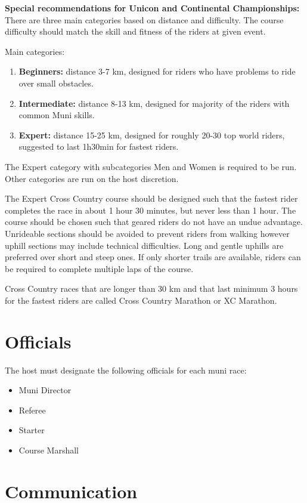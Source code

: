 \textbf{Special recommendations for Unicon and Continental Championships:}\\
There are three main categories based on distance and difficulty.
The course difficulty should match the skill and fitness of the riders at given event.

Main categories:
\begin{enumerate}
\item \textbf{Beginners:} distance 3-7 km, designed for riders who have problems to ride over small obstacles.
\item \textbf{Intermediate:} distance 8-13 km, designed for majority of the riders with common Muni skills.
\item \textbf{Expert:} distance 15-25 km, designed for roughly 20-30 top world riders, suggested to last 1h30min for fastest riders.
\end{enumerate}

The Expert category with subcategories Men and Women is required to be run.
Other categories are run on the host discretion.

The Expert Cross Country course should be designed such that the fastest rider completes the race in about 1 hour 30 minutes, but never less than 1 hour.
The course should be chosen such that geared riders do not have an undue advantage.
Unrideable sections should be avoided to prevent riders from walking however uphill sections may include technical difficulties.
Long and gentle uphills are preferred over short and steep ones.
If only shorter trails are available, riders can be required to complete multiple laps of the course.

Cross Country races that are longer than 30 km and that last minimum 3 hours for the fastest riders are called Cross Country Marathon or XC Marathon.

\section{Officials}

The host must designate the following officials for each muni race:
\begin{itemize}
\item Muni Director
\item Referee
\item Starter
\item Course Marshall
\end{itemize}

\section{Communication}

